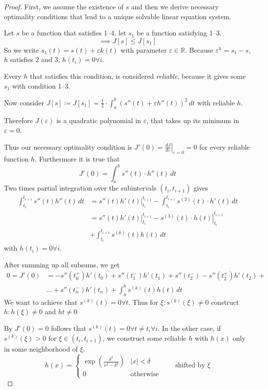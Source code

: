 \documentclass[a4paper]{article}
\numberwithin{lecref}{section}
\theoremstyle{break}
\newcommand{\Abs}[1]{\left|#1\right|}
\begin{document}
\begin{proof}
  First, we assume the existence of $s$ and then we derive necessary optimality conditions that lead to a unique solvable linear equation system.

  Let $s$ be a function that satisfies 1--4, let $s_1$ be a function satisfying 1--3.
  \[ \implies J[s] \leq J[s_1] \]
  So we write $s_1(t) = s(t) + \varepsilon k(t)$ with parameter $\varepsilon \in \mathbb R$.
  Because $\varepsilon^h = s_1 - s$, $h$ satisfies 2 and 3, $h(t_i) = 0 \forall i$.

  Every $h$ that satisfies this condition, is considered \emph{reliable}, because it gives some $s_1$ with condition 1--3.

  Now consider $J[s] \coloneqq J[s_1] = \frac 12 \cdot \int_a^b (s''(t) + \varepsilon h''(t))^2 \, dt$ with reliable $h$.

  Therefore $J(\varepsilon)$ is a quadratic polynomial in $\varepsilon$, that takes up its minimum in $\varepsilon = 0$.

  Thus our necessary optimality condition is $J'(0) = \left.\frac{dJ}{d\varepsilon}\right|_{\varepsilon=0} = 0$ for every reliable function $h$. Furthermore it is true that
  \[ J'(0) = \int_a^b s''(t) \cdot h''(t) \, dt \]
  Two times partial integration over the subintervals $(t_i, t_{i+1})$ gives
  \begin{align*}
    \int_{t_i}^{t_{i+1}} s''(t) h''(t) \, dt
      &= \left. s''(t) h'(t) \right|_{t_i}^{t_{i+1}} - \int_{t_i}^{t_{i+1}} s^{(3)}(t) \cdot h'(t) \, dt \\
      &= \left. s''(t) h'(t) \right|_{t_i}^{t_{i+1}} - \left. s^{(3)}(t) \cdot h(t) \right|_{t_i}^{t_{i+1}} \\
      &+ \int_{t_i}^{t_{i+1}} s^{(k)}(t) h(t) \, dt
  \end{align*}
  with $h(t_i) = 0 \forall i$.

  After summing up all subsums, we get
  \begin{align*}
    0 = J'(0) &= -s''(t_0^+) h'(t_0) + s''(t_1^-) h'(t_1) + s''(t_2^-) - s''(t_2^+) h'(t_2) + \\
              &\dots + s''(t_n^-) h'(t_n) + \int_a^b s^{(k)}(t) h(t) \, dt
  \end{align*}
  We want to achieve that $s^{(k)}(t) = 0 \forall t$. Thus for $\xi: s^{(k)}(\xi) \neq 0$ construct $h: h(\xi) \neq 0$ and $ht \neq 0$

  By $J'(0) = 0$ follows that $s^{(k)}(t) = 0 \forall t \neq t_i \forall i$. In the other case, if $s^{(k)}(\xi) > 0$ for $\xi \in (t_i, t_{i+1})$, we construct some reliable $h$ with $h(x)$ only in some neighborhood of $\xi$.
  \[
    h(x) = \begin{cases}
      \exp\left(\frac{\delta^2}{x^2 - \delta^2}\right) & \Abs{x} < \delta \\
      0 & \text{otherwise}
    \end{cases}
    \qquad \text{shifted by $\xi$}
  \]


\end{proof}
\end{document}
